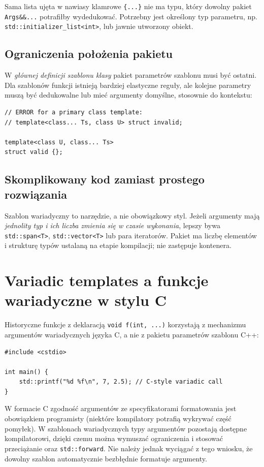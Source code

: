 Sama lista ujęta w nawiasy klamrowe \texttt{\{...\}} nie ma
typu, który dowolny pakiet \texttt{Args\&\&...} potrafiłby
wydedukować. Potrzebny jest określony typ parametru,
np. \texttt{std::initializer\_list}\allowbreak\texttt{<int>}, lub jawnie
utworzony obiekt.

\subsection{Ograniczenia położenia pakietu}

W \emph{głównej definicji szablonu klasy} pakiet parametrów
szablonu musi być ostatni. Dla szablonów funkcji istnieją
bardziej elastyczne reguły, ale kolejne parametry muszą
być dedukowalne lub mieć argumenty domyślne, stosownie do
kontekstu:

\begin{lstlisting}
// ERROR for a primary class template:
// template<class... Ts, class U> struct invalid;

template<class U, class... Ts>
struct valid {};
\end{lstlisting}

\subsection{Skomplikowany kod zamiast prostego rozwiązania}

Szablon wariadyczny to narzędzie, a nie obowiązkowy styl.
Jeżeli argumenty mają \emph{jednolity typ i ich liczba
zmienia się w czasie wykonania}, lepszy bywa
\texttt{std::span<T>}, \texttt{std::vector<T>} lub para
iteratorów. Pakiet ma liczbę elementów i strukturę typów
ustalaną na etapie kompilacji; nie zastępuje kontenera.

\section{Variadic templates a funkcje wariadyczne w stylu C}

Historyczne funkcje z deklaracją \texttt{void f(int, ...)}
korzystają z mechanizmu argumentów wariadycznych języka C,
a nie z pakietu parametrów szablonu C++:

\begin{lstlisting}
#include <cstdio>

int main() {
    std::printf("%d %f\n", 7, 2.5); // C-style variadic call
}
\end{lstlisting}

W formacie C zgodność argumentów ze specyfikatorami
formatowania jest obowiązkiem programisty (niektóre
kompilatory potrafią wykrywać część pomyłek). W szablonach
wariadycznych typy argumentów pozostają dostępne
kompilatorowi, dzięki czemu można wymuszać ograniczenia
i stosować przeciążanie oraz \texttt{std::forward}.
Nie należy jednak wyciągać z tego wniosku, że dowolny
szablon automatycznie bezbłędnie formatuje argumenty.

